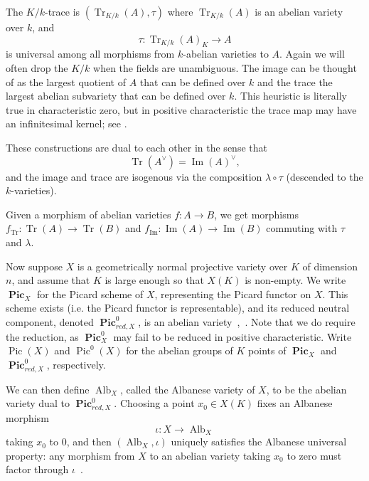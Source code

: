 \documentclass[times, doublespace]{amsart}
\numberwithin{equation}{section}
\theoremstyle{plain}
\theoremstyle{definition}
\DeclareMathOperator{\Pic}{Pic}
\DeclareMathOperator{\cPic}{\mathbf{Pic}}
\DeclareMathOperator{\Alb}{Alb}
\renewcommand{\Im}{\operatorname{Im}}
\newcommand{\Tr}{\operatorname{Tr}}
\begin{document}
The $K/k$-trace is $\left(\Tr_{K/k}(A),\tau\right)$ where $\Tr_{K/k}(A)$ is an abelian variety over $k$, and 
\[\tau:\Tr_{K/k}(A)_K\longrightarrow A\]
is universal among all morphisms from $k$-abelian varieties to $A$. Again we will often drop the $K/k$ when the fields are unambiguous. The image can be thought of as the largest quotient of $A$ that can be defined over $k$ and the trace the largest abelian subvariety that can be defined over $k$. This heuristic is literally true in characteristic zero, but in positive characteristic the trace map may have an infinitesimal kernel; see \cite[Section 6]{conradtrace}.

These constructions are dual to each other in the sense that 
\[\Tr(A^{\vee})=\Im(A)^{\vee},\]
and the image and trace are isogenous via the composition $\lambda\circ\tau$ (descended to the $k$-varieties). 

Given a morphism of abelian varieties $f:A\to B$, we get morphisms $f_{\Tr}:\Tr(A)\to\Tr(B)$ and $f_{\Im}:\Im(A)\to\Im(B)$ commuting with $\tau$ and $\lambda$. 

Now suppose $X$ is a geometrically normal projective variety over $K$ of dimension $n$, and assume that $K$ is large enough so that $X(K)$ is non-empty. We write $\cPic_X$ for the Picard scheme of $X$, representing the Picard functor on $X$. This scheme exists (i.e. the Picard functor is representable), and its reduced neutral component, denoted $\cPic^0_{red,X}$, is an abelian variety~\cite{Kleiman},~\cite[Lec. 236]{FGA}. Note that we do require the reduction, as $\cPic^0_X$ may fail to be reduced in positive characteristic. Write $\Pic(X)$ and $\Pic^0(X)$ for the abelian groups of $K$ points of $\cPic_X$ and $\cPic^0_{red,X}$, respectively.

We can then define $\Alb_X$, called the Albanese variety of $X$, to be the abelian variety dual to $\cPic^0_{red,X}$. Choosing a point $x_0\in X(K)$ fixes an Albanese morphism 
\[\iota:X\longrightarrow \Alb_X\]
taking $x_0$ to $0$, and then $(\Alb_X,\iota)$ uniquely satisfies the Albanese universal property: any morphism from $X$ to an abelian variety taking $x_0$ to zero must factor through $\iota$~\cite{Wittenberg08}.
\end{document}
